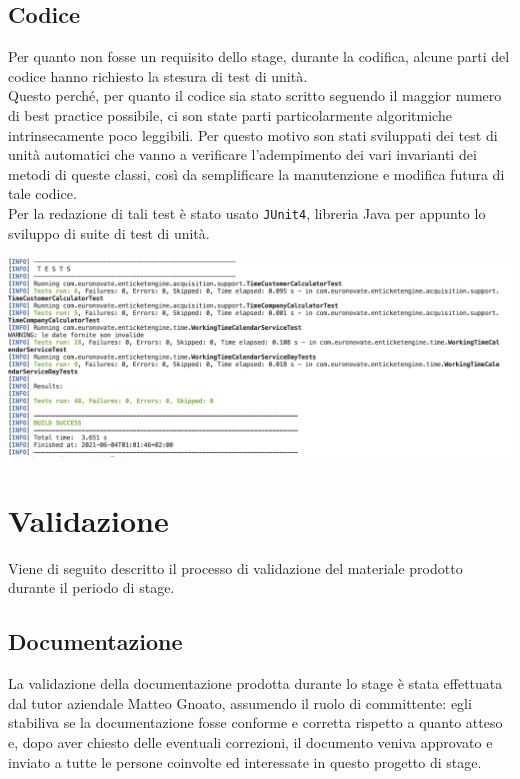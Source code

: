 		\subsection{Codice}
			Per quanto non fosse un requisito dello stage, durante la codifica, alcune parti del codice hanno richiesto la stesura di test di unità. \\
			Questo perché, per quanto il codice sia stato scritto seguendo il maggior numero di best practice possibile, ci son state parti particolarmente algoritmiche intrinsecamente poco leggibili. Per questo motivo son stati sviluppati dei test di unità automatici che vanno a verificare l'adempimento dei vari invarianti dei metodi di queste classi, così da semplificare la manutenzione e modifica futura di tale codice. \\
			Per la redazione di tali test è stato usato \texttt{JUnit4}, libreria Java per appunto lo sviluppo di suite di test di unità.
			\begin{center}
				\includegraphics[keepaspectratio = true, width=16cm]{immagini/test.png}
			\end{center}
	\section{Validazione}
		Viene di seguito descritto il processo di validazione del materiale prodotto durante il periodo di stage.
		\subsection{Documentazione}
			La validazione  della documentazione prodotta durante lo stage è stata effettuata dal tutor aziendale Matteo Gnoato, assumendo il ruolo di committente: egli stabiliva se la documentazione fosse conforme e corretta rispetto a quanto atteso e, dopo aver chiesto delle eventuali correzioni, il documento veniva approvato e inviato a tutte le persone coinvolte ed interessate in questo progetto di stage.

